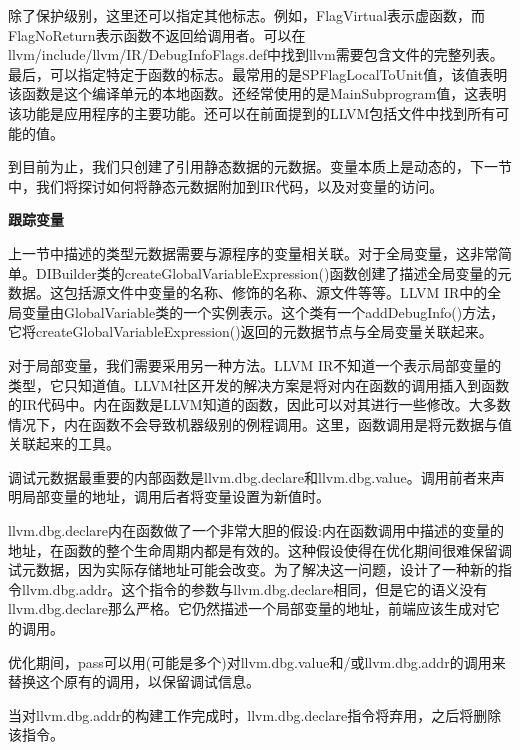 除了保护级别，这里还可以指定其他标志。例如，FlagVirtual表示虚函数，而FlagNoReturn表示函数不返回给调用者。可以在llvm/include/llvm/IR/DebugInfoFlags.def中找到llvm需要包含文件的完整列表。最后，可以指定特定于函数的标志。最常用的是SPFlagLocalToUnit值，该值表明该函数是这个编译单元的本地函数。还经常使用的是MainSubprogram值，这表明该功能是应用程序的主要功能。还可以在前面提到的LLVM包括文件中找到所有可能的值。\par

到目前为止，我们只创建了引用静态数据的元数据。变量本质上是动态的，下一节中，我们将探讨如何将静态元数据附加到IR代码，以及对变量的访问。\par

\hspace*{\fill} \par %
\textbf{跟踪变量}

上一节中描述的类型元数据需要与源程序的变量相关联。对于全局变量，这非常简单。DIBuilder类的createGlobalVariableExpression()函数创建了描述全局变量的元数据。这包括源文件中变量的名称、修饰的名称、源文件等等。LLVM IR中的全局变量由GlobalVariable类的一个实例表示。这个类有一个addDebugInfo()方法，它将createGlobalVariableExpression()返回的元数据节点与全局变量关联起来。\par

对于局部变量，我们需要采用另一种方法。LLVM IR不知道一个表示局部变量的类型，它只知道值。LLVM社区开发的解决方案是将对内在函数的调用插入到函数的IR代码中。内在函数是LLVM知道的函数，因此可以对其进行一些修改。大多数情况下，内在函数不会导致机器级别的例程调用。这里，函数调用是将元数据与值关联起来的工具。\par

调试元数据最重要的内部函数是llvm.dbg.declare和llvm.dbg.value。调用前者来声明局部变量的地址，调用后者将变量设置为新值时。\par

\begin{tcolorbox}[colback=blue!5!white,colframe=blue!75!black, title=以后的LLVM版本将用llvm.dbg.addr指令替换llvm.dbg.declare]
	
\hspace*{0.7cm}llvm.dbg.declare内在函数做了一个非常大胆的假设:内在函数调用中描述的变量的地址，在函数的整个生命周期内都是有效的。这种假设使得在优化期间很难保留调试元数据，因为实际存储地址可能会改变。为了解决这一问题，设计了一种新的指令llvm.dbg.addr。这个指令的参数与llvm.dbg.declare相同，但是它的语义没有llvm.dbg.declare那么严格。它仍然描述一个局部变量的地址，前端应该生成对它的调用。\par

\hspace*{0.7cm}优化期间，pass可以用(可能是多个)对llvm.dbg.value和/或llvm.dbg.addr的调用来替换这个原有的调用，以保留调试信息。\par

\hspace*{0.7cm}当对llvm.dbg.addr的构建工作完成时，llvm.dbg.declare指令将弃用，之后将删除该指令。

\end{tcolorbox}

